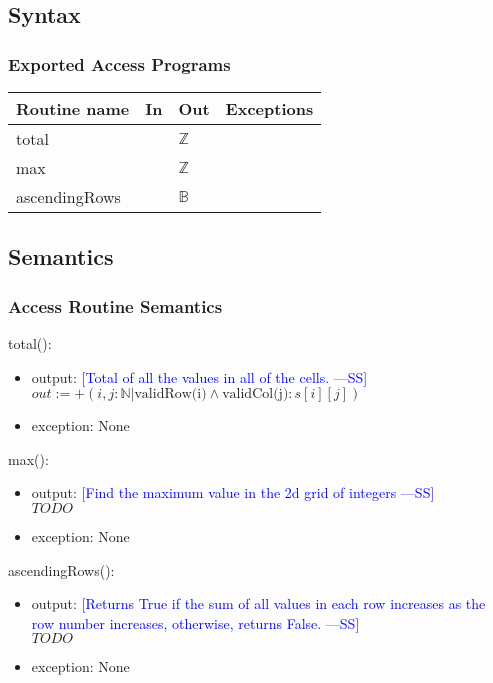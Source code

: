 \documentclass[12pt]{article}
\newcommand{\authornote}[3]{\textcolor{#1}{[#3 ---#2]}}
\newcommand{\authornote}[3]{}
\newcommand{\wss}[1]{\authornote{blue}{SS}{#1}}
\begin{document}
\subsection* {Syntax}

\subsubsection* {Exported Access Programs}

\begin{tabular}{| l | l | l | p{6cm} |}
\hline
\textbf{Routine name} & \textbf{In} & \textbf{Out} & \textbf{Exceptions}\\
\hline
total & & $\mathbb{Z}$ & \\
\hline
max &  & $\mathbb{Z}$ & \\
\hline
ascendingRows & & $\mathbb{B}$ & \\
\hline
\end{tabular}

\subsection* {Semantics}

\subsubsection* {Access Routine Semantics}

\noindent total():
\begin{itemize}
\item output: \wss{Total of all the values in all of the cells.}\\
$out := +(i,j : \mathbb{N} | \mbox{validRow(i)} \land \mbox{validCol(j)} : s[i][j])$
\item exception: None
\end{itemize}

\noindent max():
\begin{itemize}
\item output: \wss{Find the maximum value in the 2d grid of integers}\\
$TODO$
\item exception: None
\end{itemize}

\noindent ascendingRows():
\begin{itemize}
\item output: \wss{Returns True if the sum of all values in each row increases
    as the row number increases, otherwise, returns False.}\\
$TODO$
\item exception: None
\end{itemize}
\end{document}
